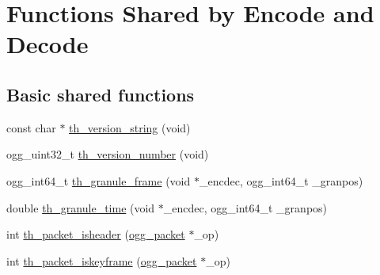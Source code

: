 \hypertarget{group__basefuncs}{\section{Functions Shared by Encode and Decode}
\label{group__basefuncs}
}
\subsection*{Basic shared functions}
\begin{DoxyCompactItemize}
\item 
const char $\ast$ \hyperlink{group__basefuncs_ga04846066738d9f2024fc9961162b2dbc}{th\+\_\+version\+\_\+string} (void)
\item 
ogg\+\_\+uint32\+\_\+t \hyperlink{group__basefuncs_gab723a75c0f95b3eb817f7f769846016b}{th\+\_\+version\+\_\+number} (void)
\item 
ogg\+\_\+int64\+\_\+t \hyperlink{group__basefuncs_ga95b10e76fc4c05d0240ea2dfd9fd62bd}{th\+\_\+granule\+\_\+frame} (void $\ast$\+\_\+encdec, ogg\+\_\+int64\+\_\+t \+\_\+granpos)
\item 
double \hyperlink{group__basefuncs_ga707e1e281de788af0df39ef00f3fb432}{th\+\_\+granule\+\_\+time} (void $\ast$\+\_\+encdec, ogg\+\_\+int64\+\_\+t \+\_\+granpos)
\item 
int \hyperlink{group__basefuncs_ga02f3f38261a9b39452d8a5e6f8737cc1}{th\+\_\+packet\+\_\+isheader} (\hyperlink{structogg__packet}{ogg\+\_\+packet} $\ast$\+\_\+op)
\item 
int \hyperlink{group__basefuncs_gafe95cfd06f0fef413266c9168a66248a}{th\+\_\+packet\+\_\+iskeyframe} (\hyperlink{structogg__packet}{ogg\+\_\+packet} $\ast$\+\_\+op)
\end{DoxyCompactItemize}
